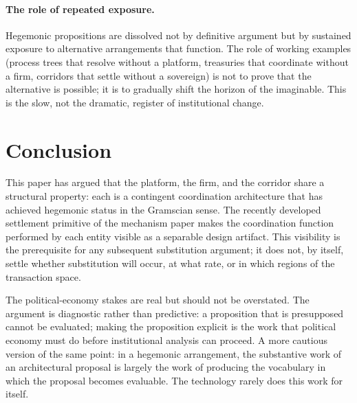 \documentclass[11pt,a4paper]{article}
\theoremstyle{remark}
\begin{document}
\paragraph{The role of repeated exposure.}
Hegemonic propositions are dissolved not by definitive argument
but by sustained exposure to alternative arrangements that
function. The role of working examples (process trees that resolve
without a platform, treasuries that coordinate without a firm,
corridors that settle without a sovereign) is not to prove that
the alternative is possible; it is to gradually shift the
horizon of the imaginable. This is the slow, not the dramatic,
register of institutional change.

\section{Conclusion}
\label{sec:conclusion}

This paper has argued that the platform, the firm, and the
corridor share a structural property: each is a contingent
coordination architecture that has achieved hegemonic status in
the Gramscian sense. The recently developed settlement primitive
of the mechanism paper makes the coordination function
performed by each entity visible as a separable design artifact.
This visibility is the prerequisite for any subsequent
substitution argument; it does not, by itself, settle whether
substitution will occur, at what rate, or in which regions of the
transaction space.

The political-economy stakes are real but should not be
overstated. The argument is diagnostic rather than predictive: a
proposition that is presupposed cannot be evaluated; making the
proposition explicit is the work that political economy must do
before institutional analysis can proceed. A more cautious version
of the same point: in a hegemonic arrangement, the substantive
work of an architectural proposal is largely the work of producing
the vocabulary in which the proposal becomes evaluable. The
technology rarely does this work for itself.
\end{document}
